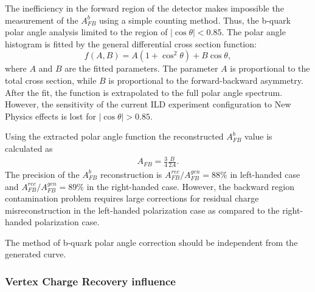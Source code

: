 The  inefficiency in the forward region of the detector makes impossible the measurement of the $A_{FB}^b$ using a simple counting method. 
Thus, the b-quark polar angle analysis limited to the region of $|\cos\theta| < 0.85$.
The polar angle histogram is fitted by the general differential cross section function:
\begin{equation}
	f(A,B) = A(1+\cos^2\theta) + B \cos\theta, %
	\label{formula:PolarAngleFit_3}
\end{equation}
where $A$ and $B$ are the fitted parameters. 
The parameter $A$ is proportional to the total cross section, while $B$ is proportional to the forward-backward asymmetry.
After the fit, the function is extrapolated to the full polar angle spectrum.
However, the sensitivity of the current ILD experiment configuration to New Physics effects is lost for $|\cos\theta| > 0.85$.

Using the extracted polar angle function the reconstructed $A_{FB}^b$ value is calculated as
\begin{eqnarray}
	A_{FB} = \frac{3}{4}\frac{B}{2 A}.
\end{eqnarray} 
The precision of the $A_{FB}^b$ reconstruction is $A_{FB}^{rec}/A^{gen}_{FB} = 88\%$ in left-handed case and  $A_{FB}^{rec}/A^{gen}_{FB} = 89\%$ in the right-handed case.  
However, the backward region contamination problem requires large corrections for residual charge misreconstruction in the left-handed polarization case as compared to the right-handed polarization case. 

The method of b-quark polar angle correction should be independent from the generated curve. 

\subsubsection{Vertex Charge Recovery influence}

